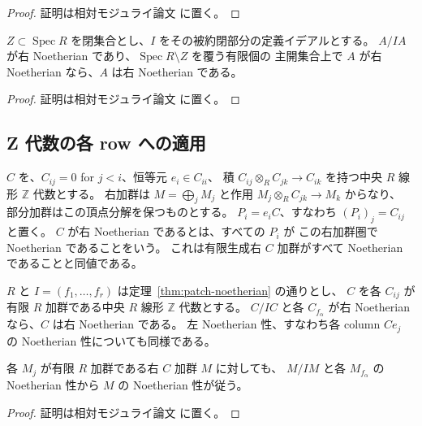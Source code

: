 \begin{proof}
証明は相対モジュライ論文 \cite[\texttt{relative_noetherian_patching}]{QuadricModuli2026} に置く。
\end{proof}

\begin{corollary}[閉集合だけを指定した形]
$Z\subset\operatorname{Spec} R$ を閉集合とし、$I$ をその被約閉部分の定義イデアルとする。
$A/IA$ が右 Noetherian であり、$\operatorname{Spec} R\setminus Z$ を覆う有限個の
主開集合上で $A$ が右 Noetherian なら、$A$ は右 Noetherian である。
\end{corollary}

\begin{proof}
証明は相対モジュライ論文 \cite[\texttt{relative_noetherian_patching}]{QuadricModuli2026} に置く。
\end{proof}

\subsection{Z 代数の各 row への適用}

\begin{definition}
$C$ を、$C_{ij}=0$ for $j<i$、恒等元 $e_i\in C_{ii}$、
積 $C_{ij}\otimes_R C_{jk}\to C_{ik}$ を持つ中央 $R$ 線形 $\mathbb Z$ 代数とする。
右加群は $M=\bigoplus_jM_j$ と作用 $M_j\otimes_R C_{jk}\to M_k$ からなり、
部分加群はこの頂点分解を保つものとする。
$P_i=e_iC$、すなわち $(P_i)_j=C_{ij}$ と置く。
$C$ が右 Noetherian であるとは、すべての $P_i$ が
この右加群圏で Noetherian であることをいう。
これは有限生成右 $C$ 加群がすべて Noetherian であることと同値である。
\end{definition}

\begin{theorem}
\label{thm:patch-z-algebra}
$R$ と $I=(f_1,\ldots,f_r)$ は定理~\ref{thm:patch-noetherian} の通りとし、
$C$ を各 $C_{ij}$ が有限 $R$ 加群である中央 $R$ 線形 $\mathbb Z$ 代数とする。
$C/IC$ と各 $C_{f_\alpha}$ が右 Noetherian なら、$C$ は右 Noetherian である。
左 Noetherian 性、すなわち各 column $Ce_j$ の Noetherian 性についても同様である。

各 $M_j$ が有限 $R$ 加群である右 $C$ 加群 $M$ に対しても、
$M/IM$ と各 $M_{f_\alpha}$ の Noetherian 性から $M$ の Noetherian 性が従う。
\end{theorem}

\begin{proof}
証明は相対モジュライ論文 \cite[\texttt{relative_noetherian_patching}]{QuadricModuli2026} に置く。
\end{proof}

